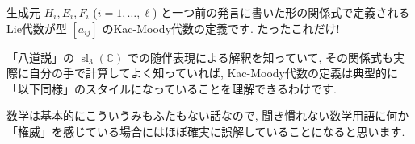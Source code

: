 \documentclass[12pt,twoside]{jarticle}
\theoremstyle{jplain}
\theoremstyle{jplain}
\theoremstyle{jplain}
\numberwithin{theorem}{section}
\numberwithin{equation}{section}
\numberwithin{figure}{section}
\numberwithin{table}{section}
\begin{document}
生成元 $H_i,E_i,F_i$ ($i=1,\ldots,\ell$) と一つ前の発言に書いた形の関係式で定義されるLie代数が型 $[a_{ij}]$ のKac-Moody代数の定義です. たったこれだけ! 

「八道説」の $\operatorname{sl}_3(\mathbb C)$ での随伴表現による解釈を知っていて, その関係式も実際に自分の手で計算してよく知っていれば, Kac-Moody代数の定義は典型的に「以下同様」のスタイルになっていることを理解できるわけです. 

数学は基本的にこういうみもふたもない話なので, 聞き慣れない数学用語に何か「権威」を感じている場合にはほぼ確実に誤解していることになると思います. 









\end{document}
